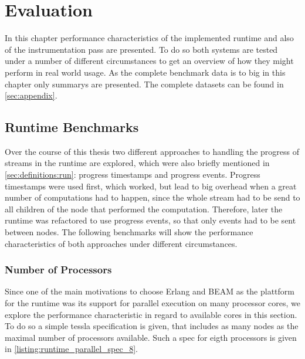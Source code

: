 %
\chapter{Evaluation}
\label{sec:evaluation}

In this chapter performance characteristics of the implemented runtime and also of the instrumentation pass are presented.
To do so both systems are tested under a number of different circumstances to get an overview of how they might perform in real world usage.
As the complete benchmark data is to big in this chapter only summarys are presented.
The complete datasets can be found in \cref{sec:appendix}.

\section{Runtime Benchmarks}
\label{sec:evaluation:runtime_benchmarks}

Over the course of this thesis two different approaches to handling the progress of streams in the runtime are explored, which were also briefly mentioned in \cref{sec:definitions:run}: progress timestamps and progress events.
Progress timestamps were used first, which worked, but lead to big overhead when a great number of computations had to happen, since the whole stream had to be send to all children of the node that performed the computation.
Therefore, later the runtime was refactored to use progress events, so that only events had to be sent between nodes.
The following benchmarks will show the performance characteristics of both approaches under different circumstances.

\subsection{Number of Processors}
\label{sec:evaluation:runtime_benchmarks:num_cores}

Since one of the main motivations to choose Erlang and BEAM as the plattform for the runtime was its support for parallel execution on many processor cores, we explore the performance characteristic in regard to available cores in this section.
To do so a simple \gls{tessla} specification is given, that includes as many nodes as the maximal number of processors available.
Such a spec for eigth processors is given in \cref{listing:runtime_parallel_spec_8}.

\begin{figure}
  
\end{figure}

